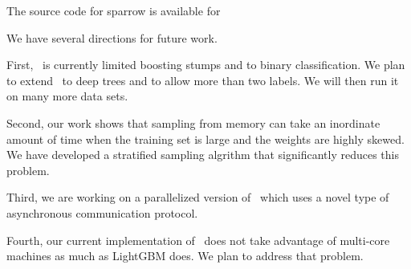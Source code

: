 The source code for sparrow is available for {\tt }

We have several directions for future work.

First, \Sparrow\ is currently limited boosting stumps and to binary
classification. We plan to extend \Sparrow\ to deep trees and to allow
more than two labels. We will then run it on many more data sets.

Second, our work shows that sampling from memory can take an
inordinate amount of time when the training set is large and the
weights are highly skewed. We have developed a stratified sampling
algrithm that significantly reduces this problem.

Third, we are working on a parallelized version of \Sparrow\ which
uses a  novel type of asynchronous communication protocol.

Fourth, our current implementation of \Sparrow\ does not take
advantage of multi-core machines as much as LightGBM does. We plan to
address that problem.





